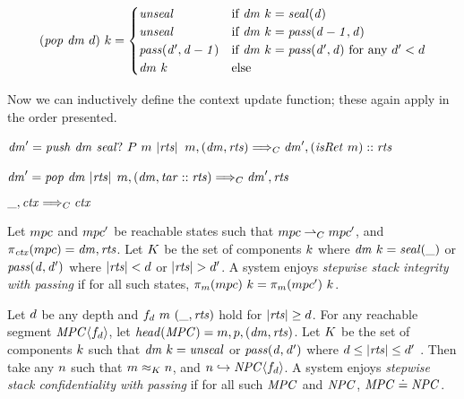 \documentclass[acmsmall,review,anonymous]{acmart}\settopmatter{printfolios=true,printccs=false,printacmref=false}
\begin{document}
\[(\mathit{pop} ~ \mathit{dm} ~ d) ~ k =
\begin{cases}
  \mathit{unseal}                 & \text{if } \mathit{dm} ~ k = \mathit{seal(d)} \\
  \mathit{unseal}                 & \text{if } \mathit{dm} ~ k = \mathit{pass(d-1,d)} \\
  \mathit{pass(d',d-1)} & \text{if } \mathit{dm} ~ k = \mathit{pass(d',d)}
                              \text{ for any } d' < d \\
  \mathit{dm}~k        & \text{else} \\
\end{cases}\]

Now we can inductively define the context update function; these again apply in the order
presented.

            {\(\mathit{dm}' = \mathit{push} ~ \mathit{dm} ~ \mathit{seal?} ~ P ~ m ~ |\mathit{rts}|\)}
            {\(m,(\mathit{dm},\mathit{rts}) \Longrightarrow_C \mathit{dm}',(\mathit{isRet} ~ m)::\mathit{rts}\)}

            {\(\mathit{dm}' = \mathit{pop} ~ \mathit{dm} ~ |\mathit{rts}|\)}
            {\(m,(\mathit{dm},\mathit{tar}::\mathit{rts}) \Longrightarrow_C \mathit{dm}',\mathit{rts}\)}

\judgment[Default]
         {}
         {\(\_,\mathit{ctx} \Longrightarrow_C \mathit{ctx}\)}

 Let \(mpc\) and \(mpc'\) be reachable states such that
\(mpc \overset{}{\rightharpoonup}_C mpc'\), and \(\pi_{\mathit{ctx}}(mpc) = \mathit{dm},\mathit{rts}\).
Let \(K\) be the set of components \(k\) where
\(\mathit{dm} ~ k = \mathit{seal(\_)}\) or \(\mathit{pass(d,d')}\) where \(|\mathit{rts}| < d\)
or \(|\mathit{rts}| > d'\). A system enjoys {\em stepwise stack integrity with passing} if for all
such states, \(\pi_m(mpc) ~ k = \pi_m(mpc') ~ k\).

 Let \(d\) be any depth and \(f_d ~ m ~ (\_, \mathit{rts})\) hold for
\(|\mathit{rts}| \geq d\). For any reachable segment \(\mathit{MPC} \langle f_d \rangle\),
let \(\mathit{head}(\mathit{MPC}) = m,p,(\mathit{dm},\mathit{rts})\). Let
\(K\) be the set of components \(k\) such that
\(\mathit{dm} ~ k = \mathit{unseal}\) or \(\mathit{pass(d,d')}\) where
\(d \leq |\mathit{rts}| \leq d'\) .
Then take any \(n\) such that \(m \approx_K n\), and
\(n \hookrightarrow \mathit{NPC}\langle f_d \rangle\). A system enjoys
{\em stepwise stack confidentiality with passing} if for all such \(\mathit{MPC}\) and \(\mathit{NPC}\),
\(\mathit{MPC} \doteq \mathit{NPC}\).
\end{document}
